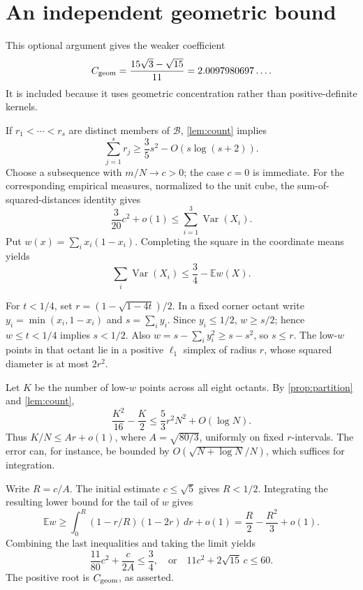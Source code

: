 \documentclass[11pt,letterpaper]{article}
\theoremstyle{definition}
\newcommand{\EE}{\mathbb E}
\newcommand{\Var}{\operatorname{Var}}
\newcommand{\calB}{\mathcal B}
\begin{document}
\section{An independent geometric bound}
\label{app:geometric}
This optional argument gives the weaker coefficient
\[
 C_{\rm geom}=\frac{15\sqrt3-\sqrt{15}}{11}
 =2.0097980697\ldots.
\]
It is included because it uses geometric concentration rather than
positive-definite kernels.

If \(r_1<\cdots<r_s\) are distinct members of \(\calB\),
\cref{lem:count} implies
\[
 \sum_{j=1}^s r_j
 \ge\frac35s^2-O(s\log(s+2)).
\]
Choose a subsequence with \(m/N\to c>0\); the case \(c=0\) is
immediate. For the corresponding empirical measures, normalized to the
unit cube, the sum-of-squared-distances identity gives
\[
 \frac3{20}c^2+o(1)
 \le \sum_{i=1}^3\Var(X_i).
\]
Put \(w(x)=\sum_i x_i(1-x_i)\). Completing the square in the
coordinate means yields
\[
 \sum_i\Var(X_i)\le\frac34-\EE w(X).
\]

For \(t<1/4\), set \(r=(1-\sqrt{1-4t})/2\).
In a fixed corner octant write
\(y_i=\min(x_i,1-x_i)\) and \(s=\sum_i y_i\).
Since \(y_i\le1/2\), \(w\ge s/2\); hence \(w\le t<1/4\)
implies \(s<1/2\). Also \(w=s-\sum_i y_i^2\ge s-s^2\), so
\(s\le r\). The low-\(w\) points in that octant lie in a positive
\(\ell_1\) simplex of radius \(r\), whose squared diameter is at
most \(2r^2\).

Let \(K\) be the number of low-\(w\) points across all eight octants.
By \cref{prop:partition} and \cref{lem:count},
\[
 \frac{K^2}{16}-\frac K2
 \le\frac53r^2N^2+O(\log N).
\]
Thus \(K/N\le Ar+o(1)\), where \(A=\sqrt{80/3}\), uniformly on
fixed \(r\)-intervals. The error can, for instance, be bounded by
\(O(\sqrt{N+\log N}/N)\), which suffices for integration.

Write \(R=c/A\). The initial estimate \(c\le\sqrt5\) gives
\(R<1/2\). Integrating the resulting lower bound for the tail of
\(w\) gives
\[
 \EE w\ge
 \int_0^R(1-r/R)(1-2r)\,dr
 +o(1)=\frac R2-\frac{R^2}3+o(1).
\]
Combining the last inequalities and taking the limit yields
\[
 \frac{11}{80}c^2+\frac{c}{2A}\le\frac34,
 \quad\text{or}\quad
 11c^2+2\sqrt{15}\,c\le60.
\]
The positive root is \(C_{\rm geom}\), as asserted.
\end{document}
